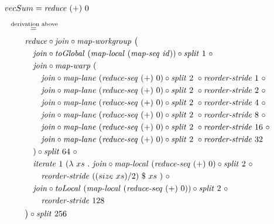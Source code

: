 \small

\begin{align*}
  &\hspace{-1.5em}vecSum = \reduce\ (+)\ 0\\[.5em]
%
  &\hspace{-2em}\quad\begin{aligned}
    &\overset{\text{derivation above}}{=\hspace{.2em}}\\
    &\qquad
      \reduce \circ \join \circ \mapWorkgroup\ \big(\\
    &\qquad\quad \join \circ \toGlobal\ (\mapLocal\ (\mapSeq\ \id)) \circ \splitN\ 1\ \circ\\
    &\qquad\quad \join \circ \mapWarp\ (\\
    &\qquad\qquad \join \circ \mapLane\ (\reduceSeq\ (+)\ 0) \circ \splitN\ 2\ \circ \reorderStride\ 1\ \circ\\
    &\qquad\qquad \join \circ \mapLane\ (\reduceSeq\ (+)\ 0) \circ \splitN\ 2\ \circ \reorderStride\ 2\ \circ\\
    &\qquad\qquad \join \circ \mapLane\ (\reduceSeq\ (+)\ 0) \circ \splitN\ 2\ \circ \reorderStride\ 4\ \circ\\
    &\qquad\qquad \join \circ \mapLane\ (\reduceSeq\ (+)\ 0) \circ \splitN\ 2\ \circ \reorderStride\ 8\ \circ\\
    &\qquad\qquad \join \circ \mapLane\ (\reduceSeq\ (+)\ 0) \circ \splitN\ 2\ \circ \reorderStride\ 16\ \circ\\
    &\qquad\qquad \join \circ \mapLane\ (\reduceSeq\ (+)\ 0) \circ \splitN\ 2\ \circ \reorderStride\ 32\\
    &\qquad\quad) \circ \splitN\ 64\ \circ\\
    &\qquad\quad \iterateN\ 1\ (\lambda\ xs\ .\ \join \circ \mapLocal\ (\reduceSeq\ (+)\ 0) \circ \splitN\ 2\ \circ\\
    &\qquad\qquad \reorderStride\ ((size\ xs)/2)\ \$\ xs\ )\ \circ\\
    &\qquad\quad \join \circ \toLocal\ (\mapLocal\ (\reduceSeq\ (+)\ 0)) \circ \splitN\ 2\ \circ\\
    &\qquad\qquad \reorderStride\ 128\\
    &\qquad\big) \circ \splitN\ 256
  \end{aligned}
\end{align*}

